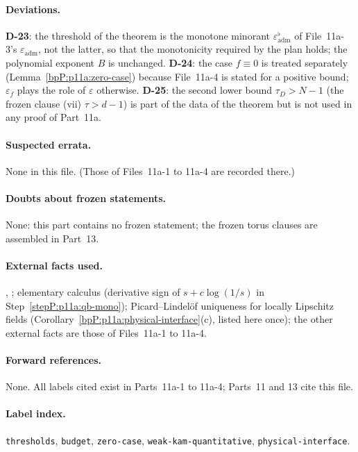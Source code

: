 \paragraph{Deviations.} \textbf{D-23}: the threshold of the theorem is the monotone minorant $\varepsilon^\flat_{\mathrm{adm}}$ of File~11a-3's $\varepsilon_{\mathrm{adm}}$, not the latter, so that the monotonicity required by the plan holds; the polynomial exponent $B$ is unchanged. \textbf{D-24}: the case $f\equiv0$ is treated separately (Lemma~\ref{bpP:p11a:zero-case}) because File~11a-4 is stated for a positive bound; $\varepsilon_f$ plays the role of $\varepsilon$ otherwise. \textbf{D-25}: the second lower bound $\tau_D>N-1$ (the frozen clause (vii) $\tau>d-1$) is part of the data of the theorem but is not used in any proof of Part~11a.

\paragraph{Suspected errata.} None in this file. (Those of Files~11a-1 to 11a-4 are recorded there.)

\paragraph{Doubts about frozen statements.} None: this part contains no frozen statement; the frozen torus clauses are assembled in Part~13.

\paragraph{External facts used.} , ; elementary calculus (derivative sign of $s+c\log(1/s)$ in Step~\ref{stepP:p11a:qb-mono}); Picard--Lindel\"of uniqueness for locally Lipschitz fields (Corollary~\ref{bpP:p11a:physical-interface}(c), listed here once); the other external facts are those of Files~11a-1 to 11a-4.

\paragraph{Forward references.} None. All labels cited exist in Parts~11a-1 to 11a-4; Parts~11 and 13 cite this file.

\paragraph{Label index.} \texttt{thresholds}, \texttt{budget}, \texttt{zero-case}, \texttt{weak-kam-quantitative}, \texttt{physical-interface}.
\par\endgroup

